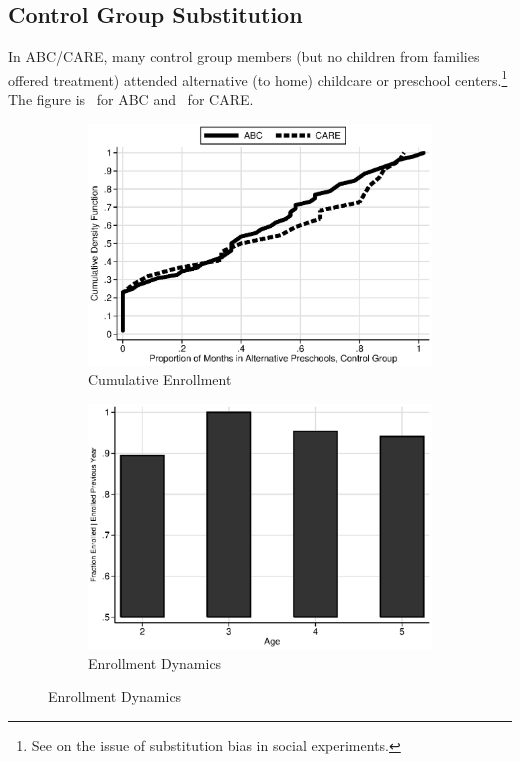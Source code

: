 \subsection{Control Group Substitution}

In ABC/CARE, many control group members (but no children from families offered treatment) attended alternative (to home) childcare or preschool centers.\footnote{See \cite{Heckman_Hohmann_etal_2000_QJE} on the issue of substitution bias in social experiments.} The figure is \treatsubsabc\ for ABC and \treatsubscarec\ for CARE.

\begin{figure}
\centering
\caption{Control Substitution Characteristics, ABC/CARE Control Group}\label{fig:control-sub}
\begin{subfigure}[h]{0.49\textwidth}
	\centering
	\caption{Cumulative Enrollment} \label{fig:treatsubcare}
	\includegraphics[width=\textwidth]{../output/abccare_controlcontamination.eps}
\end{subfigure}
\begin{subfigure}[h]{0.49\textwidth}
	\centering
	\caption{Enrollment Dynamics} \label{fig:proportion-alt-pre}
	\includegraphics[width=\textwidth]{../output/abccare_Vprobs.eps}

\end{subfigure}
\end{figure}
